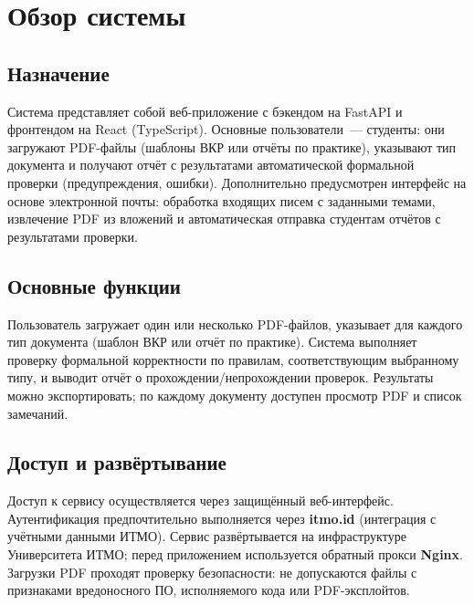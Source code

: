 \section{Обзор системы}

\subsection{Назначение}

Система представляет собой веб-приложение с бэкендом на FastAPI и фронтендом на React (TypeScript). Основные пользователи~--- студенты: они загружают PDF-файлы (шаблоны ВКР или отчёты по практике), указывают тип документа и получают отчёт с результатами автоматической формальной проверки (предупреждения, ошибки). Дополнительно предусмотрен интерфейс на основе электронной почты: обработка входящих писем с заданными темами, извлечение PDF из вложений и автоматическая отправка студентам отчётов с результатами проверки.

\subsection{Основные функции}

Пользователь загружает один или несколько PDF-файлов, указывает для каждого тип документа (шаблон ВКР или отчёт по практике). Система выполняет проверку формальной корректности по правилам, соответствующим выбранному типу, и выводит отчёт о прохождении/непрохождении проверок. Результаты можно экспортировать; по каждому документу доступен просмотр PDF и список замечаний.

\subsection{Доступ и развёртывание}

Доступ к сервису осуществляется через защищённый веб-интерфейс. Аутентификация предпочтительно выполняется через \textbf{itmo.id} (интеграция с учётными данными ИТМО). Сервис развёртывается на инфраструктуре Университета ИТМО; перед приложением используется обратный прокси \textbf{Nginx}. Загрузки PDF проходят проверку безопасности: не допускаются файлы с признаками вредоносного ПО, исполняемого кода или PDF-эксплойтов.
